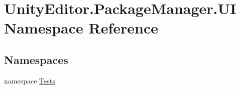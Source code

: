 \hypertarget{namespace_unity_editor_1_1_package_manager_1_1_u_i}{}\section{Unity\+Editor.\+Package\+Manager.\+UI Namespace Reference}
\label{namespace_unity_editor_1_1_package_manager_1_1_u_i}
\subsection*{Namespaces}
\begin{DoxyCompactItemize}
\item 
namespace \mbox{\hyperlink{namespace_unity_editor_1_1_package_manager_1_1_u_i_1_1_tests}{Tests}}
\end{DoxyCompactItemize}
